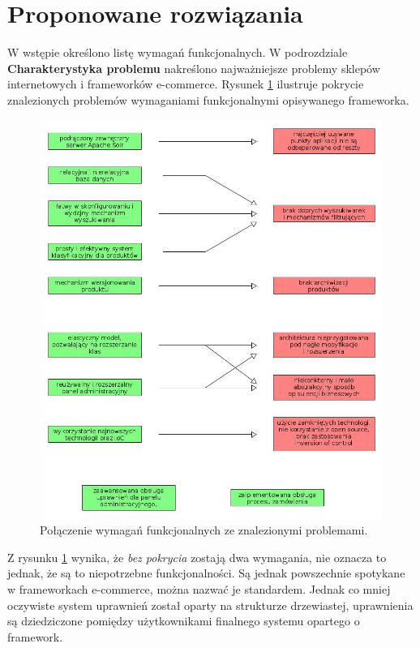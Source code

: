 \section{Proponowane rozwiązania}
W wstępie określono listę wymagań funkcjonalnych. W podrozdziale \textbf{Charakterystyka problemu} nakreślono najważniejsze problemy sklepów internetowych i frameworków e-commerce. Rysunek \ref{wymagania} ilustruje pokrycie znalezionych problemów wymaganiami funkcjonalnymi opisywanego frameworka.
\begin{figure}
	\begin{center}
		\includegraphics[width=1\textwidth]{wymagania.jpg}
	\end{center}
	\caption{{\color{dgray}Połączenie wymagań funkcjonalnych ze znalezionymi problemami.}} \label{wymagania}
\end{figure} 


 Z rysunku \ref{wymagania} wynika, że \textit{bez pokrycia} zostają dwa wymagania, nie oznacza to jednak, że są to niepotrzebne funkcjonalności. Są jednak powszechnie spotykane w frameworkach e-commerce, można nazwać je standardem. Jednak co mniej oczywiste system uprawnień został oparty na strukturze drzewiastej, uprawnienia są dziedziczone pomiędzy użytkownikami finalnego systemu opartego o framework.
